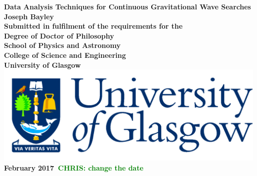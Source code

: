 \documentclass[12pt,titlepage,oneside]{book}
\newcommand{\chris}[1]{\textbf{\textcolor{green}{CHRIS: #1}}}
\begin{document}
\begin{titlepage}
\centering
\vspace*{3cm}  %
\bfseries\Large
Data Analysis Techniques for Continuous Gravitational Wave Searches\\
\vspace{3cm}
\normalfont\large
Joseph Bayley\\
\vspace{2cm}
Submitted in fulfilment of the requirements for the\\
Degree of Doctor of Philosophy\\
\vspace{2cm}
School of Physics and Astronomy\\
College of Science and Engineering\\
University of Glasgow\\
\vspace{1cm}
\includegraphics[scale=0.125]{GlaLogo.pdf}
\\
\vspace{1cm}
February 2017~\chris{change the date}
\end{titlepage}
\frontmatter  %

\glsunsetall
\tableofcontents
\listoftables
\listoffigures
\glsresetall



\printglossaries
	


\mainmatter %














\appendix



%
%

\printbibliography 
\end{document}
